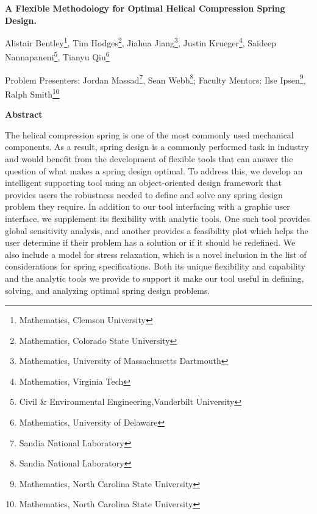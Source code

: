 \documentclass[10pt]{article}
\begin{document}
\centerline{\large \bf  A Flexible Methodology for Optimal Helical Compression Spring Design.  }

\vspace{.1truein}

\def\thefootnote{\arabic{footnote}}
\begin{center}
  
  Alistair Bentley\footnote{Mathematics, Clemson University},
   Tim Hodges\footnote{Mathematics, Colorado State University},
   Jiahua Jiang\footnote{Mathematics, University of Massachusetts Dartmouth },
  Justin Krueger\footnote{Mathematics, Virginia Tech},
  Saideep Nannapaneni\footnote{Civil \& Environmental Engineering,Vanderbilt University},
  Tianyu Qiu\footnote{Mathematics, University of Delaware}
   
\end{center}



\begin{center}
Problem Presenters: Jordan Massad\footnote{Sandia National Laboratory},
Sean Webb\footnote{Sandia National Laboratory};
	Faculty Mentors: Ilse Ipsen\footnote{Mathematics, North Carolina State University},
	Ralph Smith\footnote{Mathematics, North Carolina State University} 
\end{center}

\vspace{.3truein}
\centerline{\bf Abstract}

The helical compression spring is one of the most commonly used mechanical components. As a result, spring design is a commonly performed task in industry and would benefit from the development of flexible tools that can answer the question of what makes a spring design optimal. To address this, we develop an intelligent supporting tool using an object-oriented design framework that provides users the robustness needed to define and solve any spring design problem they require. In addition to our tool interfacing with a graphic user interface, we supplement its flexibility with analytic tools. One such tool provides global sensitivity analysis, and another provides a feasibility plot which helps the user determine if their problem has a solution or if it should be redefined. We also include a model for stress relaxation, which is a novel inclusion in the list of considerations for spring specifications. Both its unique flexibility and capability and the analytic tools we provide to support it make our tool useful in defining, solving, and analyzing optimal spring design problems. 
\end{document}
